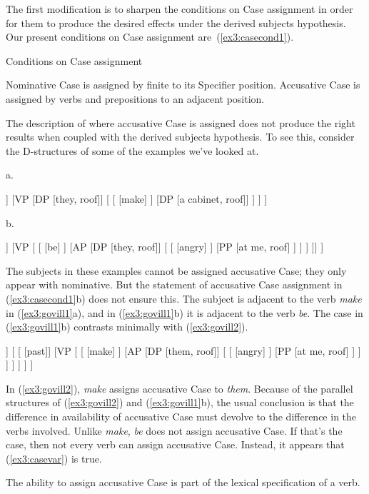 The first modification is to sharpen the conditions on Case assignment in order for them to produce the desired effects under the derived subjects hypothesis. Our present conditions on Case assignment are~(\ref{ex3:casecond1}).
\begin{exe}
\ex \label{ex3:casecond1} Conditions on Case assignment
\begin{xlist}
	\ex Nominative Case is assigned by finite  to its Specifier position.
	\ex Accusative Case is assigned by verbs and prepositions to an adjacent position.
\end{xlist}
\end{exe}
The description of where accusative Case is assigned does not produce the right results when coupled with the derived subjects hypothesis. To see this, consider the D-structures of some of the examples we've looked at.
\begin{exe}
\ex \label{ex3:govill1} 
\small
a.
\hspace*{-14pt}
\begin{forest}
[\ibar{I}
	[\obar{I} [should]]
	[VP 
		[DP [they, roof]]
		[
			[ [make] ]
			[DP [a cabinet, roof]]
		 ]
	]
]
\end{forest}
\hspace*{-5pt}
b.
\begin{forest}
[\ibar{I}
	[\obar{I} [present]]
	[VP [
		[ ]
		[AP
			[DP [they, roof]]
			[
				[ [angry] ]
				[PP [at me, roof] ]
			 ]
		 ]
	]]
]
\end{forest}
\end{exe}
The subjects in these examples cannot be assigned accusative Case; they only appear with nominative. But the statement of accusative Case assignment in (\ref{ex3:casecond1}b) does not ensure this. The subject is adjacent to the verb \emph{make} in (\ref{ex3:govill1}a), and in (\ref{ex3:govill1}b) it is adjacent to the verb \emph{be}. The case in (\ref{ex3:govill1}b) contrasts minimally with (\ref{ex3:govill2}).
\begin{exe}
\ex \label{ex3:govill2} 
\small
\begin{forest}
[IP
	[DP [she, roof]]
	[ 
		[ [past]]
		[VP [
			[ [make] ]
			[AP
				[DP [them, roof]]
				[
					[ [angry] ]
					[PP [at me, roof] ]
				 ]
			 ]
		] ]
	]
]
\end{forest}
\end{exe}
In (\ref{ex3:govill2}), \emph{make} assigns accusative Case to \emph{them}. Because of the parallel structures of (\ref{ex3:govill2}) and (\ref{ex3:govill1}b), the usual conclusion is that the difference in availability of accusative Case must devolve to the difference in the verbs involved. Unlike \emph{make}, \emph{be} does not assign accusative Case. If that's the case, then not every verb can assign accusative Case. Instead, it appears that (\ref{ex3:casevar}) is true.
\begin{exe}
\ex \label{ex3:casevar} The ability to assign accusative Case is part of the lexical specification of a verb.
\end{exe}

